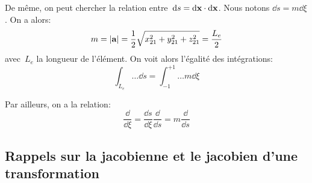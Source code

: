 \medskipvm
De même, on peut chercher la relation entre~$\dd s=\dd\VV{x}\cdot\dd\VV{x}$. Nous notons $\dd s=m \dd \xi$. On a alors: 
\begin{equation}m=|\VV{a}| = \frac12 \sqrt{x_{21}^2+y_{21}^2+z_{21}^2} = \frac{L_e}2 \end{equation}
avec~$L_e$ la longueur de l'élément. On voit alors l'égalité des intégrations:
\begin{equation}\int_{L_e} \ldots \dd s = \int_{-1}^{+1}\ldots m \dd \xi\end{equation}

\medskipvm
Par ailleurs, on a la relation:
\begin{equation} \frac{\dd}{ \dd \xi} = \frac{\dd s}{ \dd \xi}\frac{\dd}{\dd s}=m\frac{\dd}{\dd s}\end{equation}

\medskip
\subsection{Rappels sur la jacobienne et le jacobien d'une transformation}\label{Sec-Jacob}

